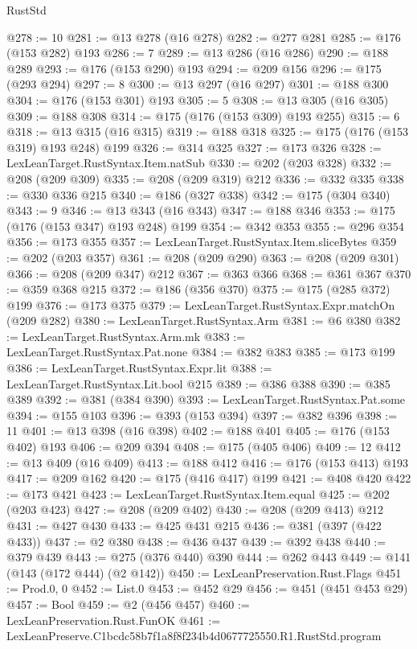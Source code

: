 \begin{lexlean}{RustStd}
\begin{coremodule}
@278 := 10
@281 := @13 @278 (@16 @278)
@282 := @277 @281
@285 := @176 (@153 @282) @193
@286 := 7
@289 := @13 @286 (@16 @286)
@290 := @188 @289
@293 := @176 (@153 @290) @193
@294 := @209 @156
@296 := @175 (@293 @294)
@297 := 8
@300 := @13 @297 (@16 @297)
@301 := @188 @300
@304 := @176 (@153 @301) @193
@305 := 5
@308 := @13 @305 (@16 @305)
@309 := @188 @308
@314 := @175 (@176 (@153 @309) @193 @255)
@315 := 6
@318 := @13 @315 (@16 @315)
@319 := @188 @318
@325 := @175 (@176 (@153 @319) @193 @248) @199
@326 := @314 @325
@327 := @173 @326
@328 := LexLeanTarget.RustSyntax.Item.natSub
@330 := @202 (@203 @328)
@332 := @208 (@209 @309)
@335 := @208 (@209 @319) @212
@336 := @332 @335
@338 := @330 @336 @215
@340 := @186 (@327 @338)
@342 := @175 (@304 @340)
@343 := 9
@346 := @13 @343 (@16 @343)
@347 := @188 @346
@353 := @175 (@176 (@153 @347) @193 @248) @199
@354 := @342 @353
@355 := @296 @354
@356 := @173 @355
@357 := LexLeanTarget.RustSyntax.Item.sliceBytes
@359 := @202 (@203 @357)
@361 := @208 (@209 @290)
@363 := @208 (@209 @301)
@366 := @208 (@209 @347) @212
@367 := @363 @366
@368 := @361 @367
@370 := @359 @368 @215
@372 := @186 (@356 @370)
@375 := @175 (@285 @372) @199
@376 := @173 @375
@379 := LexLeanTarget.RustSyntax.Expr.matchOn (@209 @282)
@380 := LexLeanTarget.RustSyntax.Arm
@381 := @6 @380
@382 := LexLeanTarget.RustSyntax.Arm.mk
@383 := LexLeanTarget.RustSyntax.Pat.none
@384 := @382 @383
@385 := @173 @199
@386 := LexLeanTarget.RustSyntax.Expr.lit
@388 := LexLeanTarget.RustSyntax.Lit.bool @215
@389 := @386 @388
@390 := @385 @389
@392 := @381 (@384 @390)
@393 := LexLeanTarget.RustSyntax.Pat.some
@394 := @155 @103
@396 := @393 (@153 @394)
@397 := @382 @396
@398 := 11
@401 := @13 @398 (@16 @398)
@402 := @188 @401
@405 := @176 (@153 @402) @193
@406 := @209 @394
@408 := @175 (@405 @406)
@409 := 12
@412 := @13 @409 (@16 @409)
@413 := @188 @412
@416 := @176 (@153 @413) @193
@417 := @209 @162
@420 := @175 (@416 @417) @199
@421 := @408 @420
@422 := @173 @421
@423 := LexLeanTarget.RustSyntax.Item.equal
@425 := @202 (@203 @423)
@427 := @208 (@209 @402)
@430 := @208 (@209 @413) @212
@431 := @427 @430
@433 := @425 @431 @215
@436 := @381 (@397 (@422 @433))
@437 := @2 @380
@438 := @436 @437
@439 := @392 @438
@440 := @379 @439
@443 := @275 (@376 @440) @390
@444 := @262 @443
@449 := @141 (@143 (@172 @444) (@2 @142))
@450 := LexLeanPreservation.Rust.Flags
@451 := Prod.{0, 0}
@452 := List.{0}
@453 := @452 @29
@456 := @451 (@451 @453 @29)
@457 := Bool
@459 := @2 (@456 @457)
@460 := LexLeanPreservation.Rust.FunOK
@461 := LexLeanPreserve.C1bcdc58b7f1a8f8f234b4d0677725550.R1.RustStd.program

\end{coremodule}
\end{lexlean}
